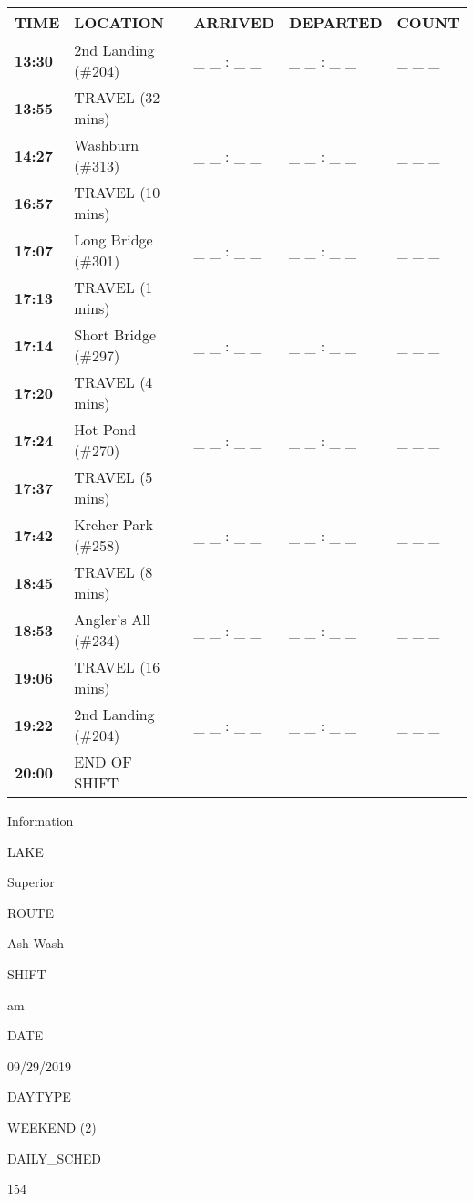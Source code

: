 \documentclass[]{article}
\begin{document}
\begin{tabular}{>{\bfseries}lllll}
\toprule
\textbf{TIME} & \textbf{LOCATION} & \textbf{ARRIVED} & \textbf{DEPARTED} & \textbf{COUNT}\\
\midrule
13:30 & 2nd Landing (\#204) & \_ \_ : \_ \_ & \_ \_ : \_ \_ & \_ \_ \_\\
13:55 & TRAVEL (32 mins) &  &  & \\
14:27 & Washburn (\#313) & \_ \_ : \_ \_ & \_ \_ : \_ \_ & \_ \_ \_\\
16:57 & TRAVEL (10 mins) &  &  & \\
17:07 & Long Bridge (\#301) & \_ \_ : \_ \_ & \_ \_ : \_ \_ & \_ \_ \_\\
17:13 & TRAVEL (1 mins) &  &  & \\
17:14 & Short Bridge (\#297) & \_ \_ : \_ \_ & \_ \_ : \_ \_ & \_ \_ \_\\
17:20 & TRAVEL (4 mins) &  &  & \\
17:24 & Hot Pond (\#270) & \_ \_ : \_ \_ & \_ \_ : \_ \_ & \_ \_ \_\\
17:37 & TRAVEL (5 mins) &  &  & \\
17:42 & Kreher Park (\#258) & \_ \_ : \_ \_ & \_ \_ : \_ \_ & \_ \_ \_\\
18:45 & TRAVEL (8 mins) &  &  & \\
18:53 & Angler's All (\#234) & \_ \_ : \_ \_ & \_ \_ : \_ \_ & \_ \_ \_\\
19:06 & TRAVEL (16 mins) &  &  & \\
19:22 & 2nd Landing (\#204) & \_ \_ : \_ \_ & \_ \_ : \_ \_ & \_ \_ \_\\
20:00 & END OF SHIFT &  &  & \\
\bottomrule
\end{tabular}\newpage

Information

LAKE

Superior

ROUTE

Ash-Wash

SHIFT

am

DATE

09/29/2019

DAYTYPE

WEEKEND (2)

DAILY\_SCHED

154

\vspace{24pt}
\end{document}
